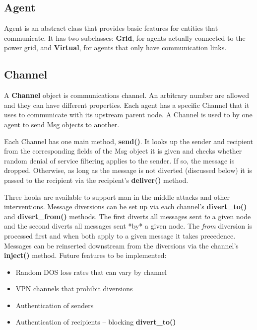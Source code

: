 \documentclass[12pt]{article}
\begin{document}
\subsection{Agent} \mbox{}
\label{subsec:objects_agent}

Agent is an abstract class that provides basic features for entities that 
communicate.  It has two subclasses: \textbf{Grid}, for agents actually connected
to the power grid, and \textbf{Virtual}, for agents that only have communication 
links.

\subsection{Channel} \mbox{}
\label{subsec:objects_channel}

A \textbf{Channel} object is communications channel.  An arbitrary number are 
allowed and they can have different properties.  Each agent has a specific 
Channel that it uses to communicate with its upstream parent node.  A Channel 
is used to by one agent to send Msg objects to another.

Each Channel has one main method, \textbf{send()}.  It looks up the sender and 
recipient from the corresponding fields of the Msg object it is given and checks 
whether random denial of service filtering applies to the sender.  If so, 
the message is dropped. Otherwise, as long as the message is not diverted (discussed
below) it is passed to the recipient via the recipient's \textbf{deliver()} method.

Three hooks are available to support man in the middle attacks and other 
interventions.  Message diversions can be set up via each channel's 
\textbf{divert\_to()} and \textbf{divert\_from()} methods. The first diverts all 
messages sent \textit{to} a given node and the second diverts all messages sent
*by* a given node. The \textit{from} diversion is processed first and when both 
apply to a given message it takes precedence.  Messages can be reinserted 
downstream from the diversions via the channel's \textbf{inject()} method.  Future 
features to be implemented:

\begin{itemize}
  \item{Random DOS loss rates that can vary by channel}
  \item{VPN channels that prohibit diversions}
  \item{Authentication of senders}
  \item{Authentication of recipients -- blocking \textbf{divert\_to()}}
\end{itemize}
\end{document}
